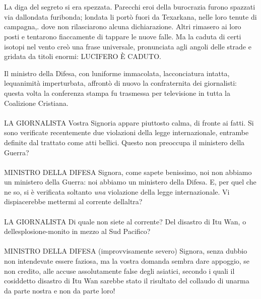 	\chapter{\phantom{title}}

\lettrine{L}{a} diga del segreto si era spezzata. Parecchi eroi della burocrazia
furono spazzati via dall\textquotesingle ondata furibonda;
l\textquotesingle ondata li portò fuori da Texarkana, nelle loro tenute
di campagna,. dove non rilasciarono alcuna dichiarazione. Altri rimasero
ai loro posti e tentarono fiaccamente di tappare le nuove falle. Ma la
caduta di certi isotopi nel vento creò una frase universale, pronunciata
agli angoli delle strade e gridata da titoli enormi: LUCIFERO È CADUTO.

Il ministro della Difesa, con l\textquotesingle uniforme immacolata,
l\textquotesingle acconciatura intatta, l\textquotesingle equanimità
imperturbata, affrontò di nuovo la confraternita dei giornalisti: questa
volta la conferenza stampa fu trasmessa per televisione in tutta la
Coalizione Cristiana.
\leavevmode\\
\leavevmode\\
LA GIORNALISTA Vostra Signoria appare piuttosto calma, di fronte ai
fatti. Si sono verificate recentemente due violazioni della legge
internazionale, entrambe definite dal trattato come atti bellici. Questo
non preoccupa il ministero della Guerra?
\leavevmode\\
\leavevmode\\
MINISTRO DELLA DIFESA Signora, come sapete benissimo, noi non abbiamo un
ministero della Guerra: noi abbiamo un ministero della Difesa. E, per
quel che ne so, si è verificata soltanto \emph{una} violazione della
legge internazionale. Vi dispiacerebbe mettermi al corrente
dell\textquotesingle altra?
\leavevmode\\
\leavevmode\\
LA GIORNALISTA Di quale non siete al corrente? Del disastro di Itu Wan,
o dell\textquotesingle esplosione-monito in mezzo al Sud Pacifico?
\leavevmode\\
\leavevmode\\
MINISTRO DELLA DIFESA (improvvisamente severo) Signora, senza dubbio non
intendevate essere faziosa, ma la vostra domanda sembra dare appoggio,
se non credito, alle accuse assolutamente false degli asiatici, secondo
i quali il cosiddetto disastro di Itu Wan sarebbe stato il risultato del
collaudo di un\textquotesingle arma da parte nostra e non da parte loro!
\leavevmode\\
